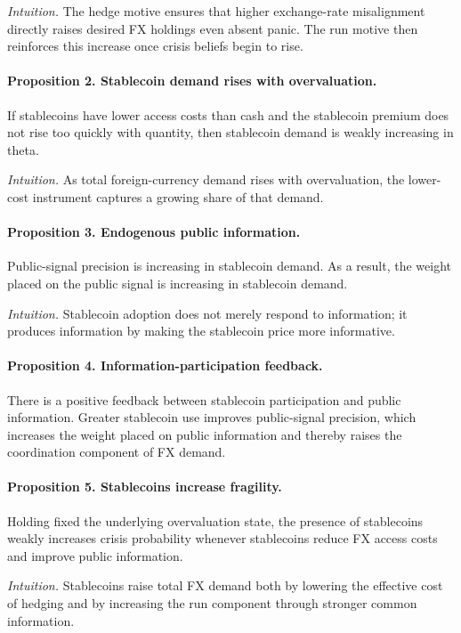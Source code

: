\emph{Intuition.} The hedge motive ensures that higher exchange-rate misalignment directly raises desired FX holdings even absent panic. The run motive then reinforces this increase once crisis beliefs begin to rise.

\paragraph{Proposition 2. Stablecoin demand rises with overvaluation.}
If stablecoins have lower access costs than cash and the stablecoin premium does not rise too quickly with quantity, then stablecoin demand is weakly increasing in theta.

\emph{Intuition.} As total foreign-currency demand rises with overvaluation, the lower-cost instrument captures a growing share of that demand.

\paragraph{Proposition 3. Endogenous public information.}
Public-signal precision is increasing in stablecoin demand. As a result, the weight placed on the public signal is increasing in stablecoin demand.

\emph{Intuition.} Stablecoin adoption does not merely respond to information; it produces information by making the stablecoin price more informative.

\paragraph{Proposition 4. Information-participation feedback.}
There is a positive feedback between stablecoin participation and public information. Greater stablecoin use improves public-signal precision, which increases the weight placed on public information and thereby raises the coordination component of FX demand.

\paragraph{Proposition 5. Stablecoins increase fragility.}
Holding fixed the underlying overvaluation state, the presence of stablecoins weakly increases crisis probability whenever stablecoins reduce FX access costs and improve public information.

\emph{Intuition.} Stablecoins raise total FX demand both by lowering the effective cost of hedging and by increasing the run component through stronger common information.

